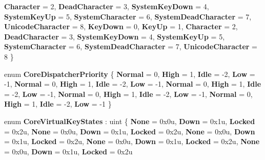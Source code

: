 \begin{DoxyCompactItemize}
{\bfseries Character} = 2, 
{\bfseries Dead\+Character} = 3, 
{\bfseries System\+Key\+Down} = 4, 
\newline
{\bfseries System\+Key\+Up} = 5, 
{\bfseries System\+Character} = 6, 
{\bfseries System\+Dead\+Character} = 7, 
{\bfseries Unicode\+Character} = 8, 
\newline
{\bfseries Key\+Down} = 0, 
{\bfseries Key\+Up} = 1, 
{\bfseries Character} = 2, 
{\bfseries Dead\+Character} = 3, 
\newline
{\bfseries System\+Key\+Down} = 4, 
{\bfseries System\+Key\+Up} = 5, 
{\bfseries System\+Character} = 6, 
{\bfseries System\+Dead\+Character} = 7, 
\newline
{\bfseries Unicode\+Character} = 8
 \}
\item 
\mbox{\label{namespace_windows_1_1_u_i_1_1_core_a612646cf897e13d073df58cbf255fea7}} 
enum {\bfseries Core\+Dispatcher\+Priority} \{ \newline
{\bfseries Normal} = 0, 
{\bfseries High} = 1, 
{\bfseries Idle} = -\/2, 
{\bfseries Low} = -\/1, 
\newline
{\bfseries Normal} = 0, 
{\bfseries High} = 1, 
{\bfseries Idle} = -\/2, 
{\bfseries Low} = -\/1, 
\newline
{\bfseries Normal} = 0, 
{\bfseries High} = 1, 
{\bfseries Idle} = -\/2, 
{\bfseries Low} = -\/1, 
\newline
{\bfseries Normal} = 0, 
{\bfseries High} = 1, 
{\bfseries Idle} = -\/2, 
{\bfseries Low} = -\/1, 
\newline
{\bfseries Normal} = 0, 
{\bfseries High} = 1, 
{\bfseries Idle} = -\/2, 
{\bfseries Low} = -\/1
 \}
\item 
\mbox{\label{namespace_windows_1_1_u_i_1_1_core_aa71ac02d1eeaccb86184a016581721ab}} 
enum {\bfseries Core\+Virtual\+Key\+States} \+: uint \{ \newline
{\bfseries None} = 0x0u, 
{\bfseries Down} = 0x1u, 
{\bfseries Locked} = 0x2u, 
{\bfseries None} = 0x0u, 
\newline
{\bfseries Down} = 0x1u, 
{\bfseries Locked} = 0x2u, 
{\bfseries None} = 0x0u, 
{\bfseries Down} = 0x1u, 
\newline
{\bfseries Locked} = 0x2u, 
{\bfseries None} = 0x0u, 
{\bfseries Down} = 0x1u, 
{\bfseries Locked} = 0x2u, 
\newline
{\bfseries None} = 0x0u, 
{\bfseries Down} = 0x1u, 
{\bfseries Locked} = 0x2u

\end{DoxyCompactItemize}
